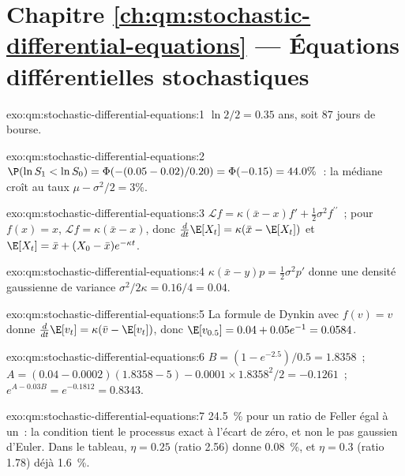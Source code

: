 \section*{Chapitre \ref{ch:qm:stochastic-differential-equations} --- Équations différentielles stochastiques}

\begin{solution}{exo:qm:stochastic-differential-equations:1}
$\ln 2/2 = 0.35$ ans, soit 87 jours de bourse.
\end{solution}

\begin{solution}{exo:qm:stochastic-differential-equations:2}
$\P(\ln S_1 < \ln S_0) = \Phi(-(0.05 - 0.02)/0.20) = \Phi(-0.15) = 44.0\%$~: la médiane croît au taux $\mu -
\sigma^2/2 = 3\%$.
\end{solution}

\begin{solution}{exo:qm:stochastic-differential-equations:3}
$\mathcal Lf = \kappa(\bar x - x)f' + \tfrac12\sigma^2f^{\prime\prime}$~; pour $f(x) = x$, $\mathcal Lf = \kappa(\bar x - x)$, donc
$\frac{d}{dt}\E[X_t] = \kappa(\bar x - \E[X_t])$ et $\E[X_t] = \bar x + (X_0 - \bar x)e^{-\kappa t}$.
\end{solution}

\begin{solution}{exo:qm:stochastic-differential-equations:4}
$\kappa(\bar x - y)p = \tfrac12\sigma^2p'$ donne une densité gaussienne de variance $\sigma^2/2\kappa = 0.16/4 = 0.04$.
\end{solution}

\begin{solution}{exo:qm:stochastic-differential-equations:5}
La formule de Dynkin avec $f(v) = v$ donne $\frac{d}{dt}\E[v_t] = \kappa(\bar v - \E[v_t])$, donc $\E[v_{0.5}] = 0.04 + 0.05e^{-1} =
0.0584$.
\end{solution}

\begin{solution}{exo:qm:stochastic-differential-equations:6}
$B = (1 - e^{-2.5})/0.5 = 1.8358$~; $A = (0.04 - 0.0002)(1.8358 - 5) - 0.0001 \times 1.8358^2/2 = -0.1261$~;
$e^{A - 0.03B} = e^{-0.1812} = 0.8343$.
\end{solution}

\begin{solution}{exo:qm:stochastic-differential-equations:7}
24.5~\% pour un ratio de Feller égal à un~: la condition tient le processus exact à l'écart de zéro, et non le
pas gaussien d'Euler. Dans le tableau, $\eta = 0.25$ (ratio 2.56) donne 0.08~\%, et $\eta = 0.3$ (ratio 1.78)
déjà 1.6~\%.
\end{solution}

